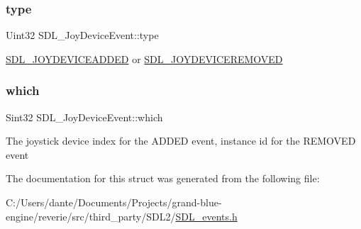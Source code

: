 \subsubsection{\texorpdfstring{type}{type}}
{\footnotesize\ttfamily Uint32 S\+D\+L\+\_\+\+Joy\+Device\+Event\+::type}

\mbox{\hyperlink{_s_d_l__events_8h_a3b589e89be6b35c02e0dd34a55f3fccaa0500c4e830a1822e6d0a90294c3f1393}{S\+D\+L\+\_\+\+J\+O\+Y\+D\+E\+V\+I\+C\+E\+A\+D\+D\+ED}} or \mbox{\hyperlink{_s_d_l__events_8h_a3b589e89be6b35c02e0dd34a55f3fccaa4e2d7a1067dc56abeee393d46309ecd0}{S\+D\+L\+\_\+\+J\+O\+Y\+D\+E\+V\+I\+C\+E\+R\+E\+M\+O\+V\+ED}} \mbox{\label{struct_s_d_l___joy_device_event_af9b295798f033b799ebbda7de6cb5a7e}} 
\subsubsection{\texorpdfstring{which}{which}}
{\footnotesize\ttfamily Sint32 S\+D\+L\+\_\+\+Joy\+Device\+Event\+::which}

The joystick device index for the A\+D\+D\+ED event, instance id for the R\+E\+M\+O\+V\+ED event 

The documentation for this struct was generated from the following file\+:\begin{DoxyCompactItemize}
\item 
C\+:/\+Users/dante/\+Documents/\+Projects/grand-\/blue-\/engine/reverie/src/third\+\_\+party/\+S\+D\+L2/\mbox{\hyperlink{_s_d_l__events_8h}{S\+D\+L\+\_\+events.\+h}}\end{DoxyCompactItemize}
